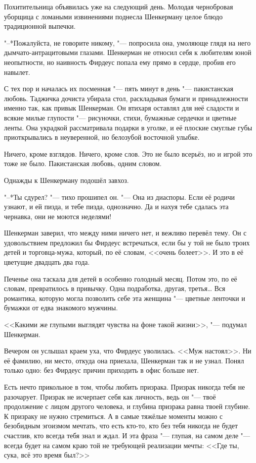 Похитительница объявилась уже на следующий день.
Молодая чернобровая уборщица с ломаными извинениями поднесла Шенкерману целое блюдо традиционной выпечки.

"--*Пожалуйста, не говорите никому, "--- попросила она, умоляюще глядя на него дымчато-антрацитовыми глазами.
Шенкерман не относил себя к любителям юной неопытности, но наивность Фирдеус попала ему прямо в сердце, пробив его навылет.

С тех пор и началась их посменная "--- пять минут в день "--- пакистанская любовь.
Таджичка дочиста убирала стол, раскладывая бумаги и принадлежности именно так, как привык Шенкерман.
Он втихаря оставлял для неё сладости и всякие милые глупости "--- рисуночки, стихи, бумажные сердечки и цветные ленты.
Она украдкой рассматривала подарки в уголке, и её плоские смуглые губы приоткрывались в неуверенной, но белозубой восточной улыбке.

Ничего, кроме взглядов.
Ничего, кроме слов.
Это не было всерьёз, но и игрой это тоже не было.
Пакистанская любовь, одним словом.

Однажды к Шенкерману подошёл завхоз.

"--*Ты сдурел? "--- тихо прошипел он.
"--- Она из диаспоры.
Если её родичи узнают, и ей пизда, и тебе пизда, однозначно.
Да и нахуя тебе сдалась эта чернавка, они не моются неделями!

Шенкерман заверил, что между ними ничего нет, и вежливо перевёл тему.
Он с удовольствием предложил бы Фирдеус встречаться, если бы у той не было троих детей и торговца-мужа, который, по её словам, <<очень болеет>>.
И это в её цветущие двадцать два года.

Печенье она таскала для детей в особенно голодный месяц.
Потом это, по её словам, превратилось в привычку.
Одна подработка, другая, третья\ldots{}
Вся романтика, которую могла позволить себе эта женщина "--- цветные ленточки и бумажки от едва знакомого мужчины.

<<Какими же глупыми выглядят чувства на фоне такой жизни>>, "--- подумал Шенкерман.

Вечером он услышал краем уха, что Фирдеус уволилась.
<<Муж настоял>>.
Ни её фамилию, ни место, откуда она приехала, Шенкерман так и не узнал.
Понял только одно: без Фирдеус причин приходить в офис больше нет.

\asterism

Есть нечто прикольное в том, чтобы любить призрака.
Призрак никогда тебя не разочарует.
Призрак не исчерпает себя как личность, ведь он "--- твоё продолжение с лицом другого человека, и глубина призрака равна твоей глубине.
К призраку не нужно стремиться.
А в самые тяжёлые моменты можно с безобидным эгоизмом мечтать, что есть кто-то, кто без тебя никогда не будет счастлив, кто всегда тебя знал и ждал.
И эта фраза "--- глупая, на самом деле "--- всегда будет на самом краю той не требующей реализации мечты:
<<Где ты, сука, всё это время был?>>


